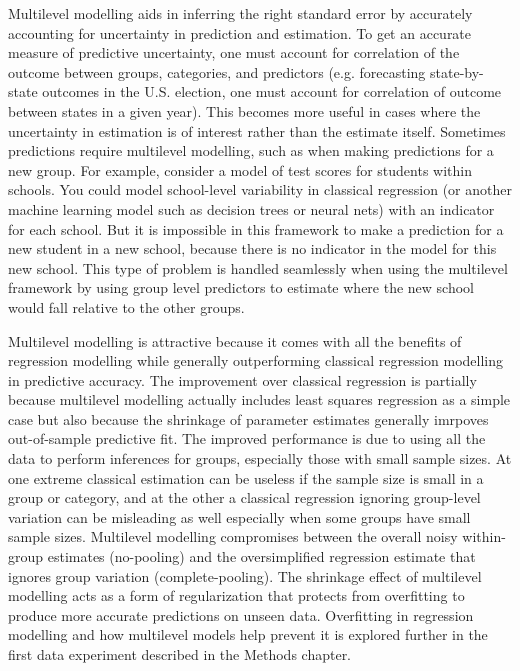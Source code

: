 Multilevel modelling aids in inferring the right standard error by accurately accounting for uncertainty in prediction and estimation. To get an accurate measure of predictive uncertainty, one must account for correlation of the outcome between groups, categories, and predictors (e.g. forecasting state-by-state outcomes in the U.S. election, one must account for correlation of outcome between states in a given year). This becomes more useful in cases where the uncertainty in estimation is of interest rather than the estimate itself. Sometimes predictions require multilevel modelling, such as when making predictions for a new group. For example, consider a model of test scores for students within schools. You could model school-level variability in classical regression (or another machine learning model such as decision trees or neural nets) with an indicator for each school. But it is impossible in this framework to make a prediction for a new student in a new school, because there is no indicator in the model for this new school. This type of problem is handled seamlessly when using the multilevel framework by using group level predictors to estimate where the new school would fall relative to the other groups.

Multilevel modelling is attractive because it comes with all the benefits of regression modelling while generally outperforming classical regression modelling in predictive accuracy. The improvement over classical regression is partially because multilevel modelling actually includes least squares regression as a simple case but also because the shrinkage of parameter estimates generally imrpoves out-of-sample predictive fit. The improved performance is due to using all the data to perform inferences for groups, especially those with small sample sizes. At one extreme classical estimation can be useless if the sample size is small in a group or category, and at the other a classical regression ignoring group-level variation can be misleading as well especially when some groups have small sample sizes. Multilevel modelling compromises between the overall noisy within-group estimates (no-pooling) and the oversimplified regression estimate that ignores group variation (complete-pooling). The shrinkage effect of multilevel modelling acts as a form of regularization that protects from overfitting to produce more accurate predictions on unseen data. Overfitting in regression modelling and how multilevel models help prevent it is explored further in the first data experiment described in the Methods chapter.

